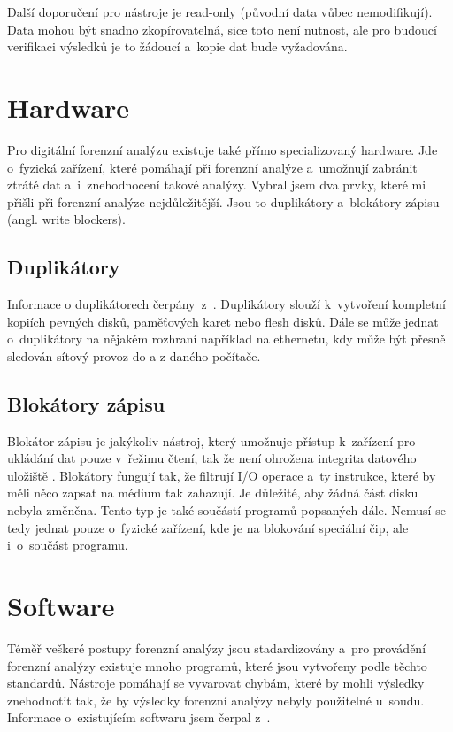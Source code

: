 \documentclass[thesis=B,czech]{FITthesis}[2012/06/26]
\begin{document}
Další doporučení pro nástroje je read-only (původní data vůbec nemodifikují). Data mohou být snadno zkopírovatelná, sice toto není nutnost, ale pro budoucí verifikaci výsledků je to žádoucí a~kopie dat bude vyžadována. 


\section{Hardware}
Pro digitální forenzní analýzu existuje také přímo specializovaný hardware. Jde o~fyzická zařízení, které pomáhají při forenzní analýze a~umožnují zabránit ztrátě dat a~i~znehodnocení takové analýzy. Vybral jsem dva prvky, které mi přišli při forenzní analýze nejdůležitější. Jsou to duplikátory a~blokátory zápisu (angl. write blockers).

\subsection{Duplikátory}
\label{duplikatory}
Informace o duplikátorech čerpány~z~\cite{for_hard}. Duplikátory slouží k~vytvoření kompletní kopiích pevných disků, paměťových karet nebo flesh disků. Dále se může jednat o~duplikátory na nějakém rozhraní například na ethernetu, kdy může být přesně sledován sítový provoz do a z daného počítače.
\subsection{Blokátory zápisu}
\label{blokatory}
Blokátor zápisu je jakýkoliv nástroj, který umožnuje přístup k~zařízení pro ukládání dat pouze v~řežimu čtení, tak že není ohrožena integrita datového uložiště \cite{for_hard2}. Blokátory fungují tak, že filtrují I/O operace a~ty instrukce, které by měli něco zapsat na médium tak zahazují. Je důležité, aby žádná část disku nebyla změněna. Tento typ je také součástí programů popsaných dále. Nemusí se tedy jednat pouze o~fyzické zařízení, kde je na blokování speciální čip, ale i~o~součást programu.

\section{Software}

Téměř veškeré postupy forenzní analýzy jsou stadardizovány a~pro provádění forenzní analýzy existuje mnoho programů, které jsou vytvořeny podle těchto standardů. Nástroje pomáhají se vyvarovat chybám, které by mohli výsledky znehodnotit tak, že by výsledky forenzní analýzy nebyly použitelné u~soudu. Informace o~existujícím softwaru jsem čerpal z~\cite{for_soft}.
\end{document}
